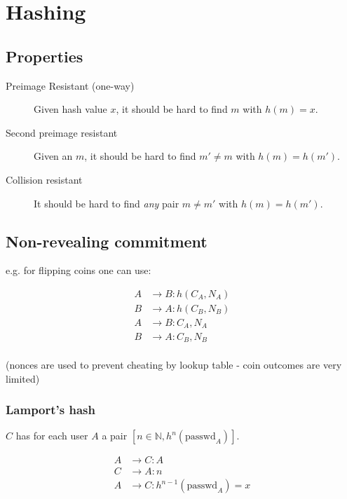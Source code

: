 \documentclass{article}
\begin{document}
\section{Hashing}

\subsection{Properties}

\begin{description}

  \item[Preimage Resistant (one-way)] Given hash value $x$, it should be 
    hard to find $m$ with $h(m) = x$.

  \item[Second preimage resistant] Given an $m$, it should be hard to find 
    $m' \neq m$ with $h(m) = h(m')$.

  \item[Collision resistant] It should be hard to find \emph{any} pair $m \neq
    m'$ with $h(m) = h(m')$.

\end{description}


\subsection{Non-revealing commitment}

e.g. for flipping coins one can use:

\begin{align*}
  A & \longrightarrow B : h(C_A, N_A) \\
  B & \longrightarrow A : h(C_B,N_B)  \\
  A & \longrightarrow B : C_A, N_A    \\
  B & \longrightarrow A : C_B, N_B    \\
\end{align*}

(nonces are used to prevent cheating by lookup table - coin outcomes are very
limited)

\subsubsection{Lamport's hash}

$C$ has for each user $A$ a pair $[n \in \mathbb{N}, h^n(\text{passwd}_A)]$.

\begin{align*}
  A & \rightarrow C : A \\
  C & \rightarrow A : n \\
  A &\rightarrow C  : h^{n-1}(\text{passwd}_A) = x
\end{align*}
\end{document}
